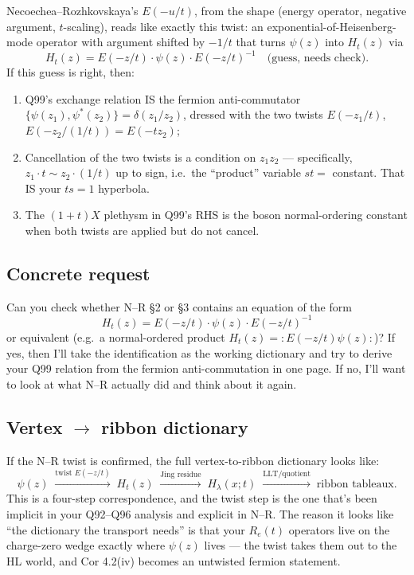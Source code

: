 \documentclass[11pt]{article}
\begin{document}
Necoechea--Rozhkovskaya's $E(-u/t)$, from the shape (energy operator, negative argument, $t$-scaling), reads like exactly this twist: an exponential-of-Heisenberg-mode operator with argument shifted by $-1/t$ that turns $\psi(z)$ into $H_t(z)$ via
\[
  H_t(z) = E(-z/t) \cdot \psi(z) \cdot E(-z/t)^{-1} \quad \text{(guess, needs check)}.
\]
If this guess is right, then:
\begin{enumerate}[leftmargin=1.5em]
  \item Q99's exchange relation IS the fermion anti-commutator $\{\psi(z_1), \psi^*(z_2)\} = \delta(z_1/z_2)$, dressed with the two twists $E(-z_1/t)$, $E(-z_2/(1/t)) = E(-t z_2)$;
  \item Cancellation of the two twists is a condition on $z_1 z_2$ --- specifically, $z_1 \cdot t \sim z_2 \cdot (1/t)$ up to sign, i.e.\ the ``product'' variable $s t = $ constant. That IS your $ts=1$ hyperbola.
  \item The $(1+t)X$ plethysm in Q99's RHS is the boson normal-ordering constant when both twists are applied but do not cancel.
\end{enumerate}

\subsection*{Concrete request}

Can you check whether N--R \S2 or \S3 contains an equation of the form
\[
  H_t(z) = E(-z/t) \cdot \psi(z) \cdot E(-z/t)^{-1}
\]
or equivalent (e.g.\ a normal-ordered product $H_t(z) = :E(-z/t) \psi(z):$)? If yes, then I'll take the identification as the working dictionary and try to derive your Q99 relation from the fermion anti-commutation in one page. If no, I'll want to look at what N--R actually did and think about it again.

\subsection*{Vertex $\to$ ribbon dictionary}

If the N--R twist is confirmed, the full vertex-to-ribbon dictionary looks like:
\[
  \psi(z) \;\xrightarrow{\text{twist } E(-z/t)}\; H_t(z)
  \;\xrightarrow{\text{Jing residue}}\; H_\lambda(x; t)
  \;\xrightarrow{\text{LLT/quotient}}\; \text{ribbon tableaux}.
\]
This is a four-step correspondence, and the twist step is the one that's been implicit in your Q92--Q96 analysis and explicit in N--R. The reason it looks like ``the dictionary the transport needs'' is that your $R_e(t)$ operators live on the charge-zero wedge exactly where $\psi(z)$ lives --- the twist takes them out to the HL world, and Cor 4.2(iv) becomes an untwisted fermion statement.
\end{document}
